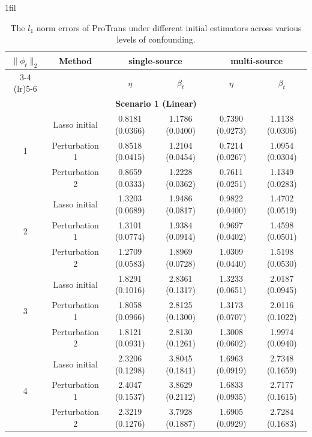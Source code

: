 \documentclass[12pt]{article}
\makeatletter
\newcommand*{\centerfloat}{%
  \parindent \z@
  \leftskip \z@ \@plus 1fil \@minus \marginparwidth
  \rightskip \leftskip
  \parfillskip \z@skip}
\makeatother
\begin{document}
\begin{table}[!ht]
\renewcommand{\arraystretch}{0.6}
\footnotesize
\centerfloat
\caption{The $l_1$ norm errors of ProTrans under different initial estimators across various levels of confounding.}
\label{tab:our_only_vary_phi_l1}
    \begin{tabular}{cccccc}
        \toprule
        \multirow{2}{*}{$\|\phi_t\|_2$} & \multirow{2}{*}{\textbf{Method}} & \multicolumn{2}{c}{\textbf{single-source}} & \multicolumn{2}{c}{\textbf{multi-source}}\\
        \cmidrule(lr){3-4} \cmidrule(lr){5-6} 
        & & $\eta$ & $\beta_{t}$ & $\eta$& $\beta_{t}$ \\
        \midrule
        \multicolumn{6}{c}{\textbf{Scenario 1 (Linear)}}\\
        \hline
        \multirow{3}{*}{1} 
        & Lasso initial &0.8181 (0.0366) &1.1786 (0.0400) &0.7390 (0.0273) &1.1138 (0.0306)\\
        & Perturbation 1& 0.8518 (0.0415)  & 1.2104 (0.0454)  & 0.7214 (0.0267) & 1.0954 (0.0304)\\ 
        & Perturbation 2  & 0.8659 (0.0333) & 1.2228 (0.0362) & 0.7611 (0.0251) & 1.1349 (0.0283) \\
        \hline
        \multirow{3}{*}{2} 
        & Lasso initial & 1.3203 (0.0689)& 1.9486 (0.0817) &0.9822 (0.0400) &1.4702 (0.0519)\\ 
        & Perturbation 1  & 1.3101 (0.0774) & 1.9384 (0.0914) & 0.9697 (0.0402) & 1.4598 (0.0501) \\ 
        & Perturbation 2 & 1.2709 (0.0583) & 1.8969 (0.0728) & 1.0309 (0.0440) & 1.5198 (0.0530) \\
        \hline
        \multirow{3}{*}{3} 
        & Lasso initial & 1.8291 (0.1016)& 2.8361 (0.1317) &1.3233 (0.0651) & 2.0187 (0.0945) \\ 
        & Perturbation 1 & 1.8058 (0.0966) & 2.8125 (0.1300) & 1.3173 (0.0707) &  2.0116 (0.1022) \\ 
        & Perturbation 2 & 1.8121 (0.0931) & 2.8130 (0.1261)  & 1.3008 (0.0602) & 1.9974 (0.0940) \\
        \hline
        \multirow{3}{*}{4} 
        & Lasso initial & 2.3206 (0.1298)& 3.8045 (0.1841) &1.6963 (0.0919) &2.7348 (0.1659)\\ 
        & Perturbation 1 & 2.4047 (0.1537) & 3.8629 (0.2112) & 1.6833 (0.0935) & 2.7177 (0.1615) \\ 
        & Perturbation 2& 2.3219 (0.1276) & 3.7928 (0.1887) & 1.6905 (0.0929) & 2.7284 (0.1683) \\

\end{tabular}
\end{table}
\end{document}
